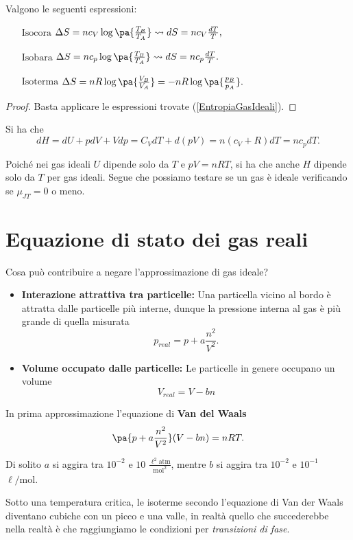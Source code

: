 \begin{proposition}
Valgono le seguenti espressioni:

\begin{itemize}
\item[$\boxed{\text{Isocora}}$] $\Delta S=nc_V\log\pa{\frac{T_B}{T_A}}\leadsto dS=nc_V\frac{dT}T,$
\item[$\boxed{\text{Isobara}}$] $\Delta S=nc_p\log\pa{\frac{T_B}{T_A}}\leadsto dS=nc_p\frac{dT}T.$
\item[$\boxed{\text{Isoterma}}$] $\Delta S=nR\log\pa{\frac{V_B}{V_A}}=-nR\log\pa{\frac{p_B}{p_A}}.$
\end{itemize}
\end{proposition}
\begin{proof}
Basta applicare le espressioni trovate (\ref{EntropiaGasIdeali}).
\end{proof}

\begin{remark}
Si ha che
\[dH=dU+pdV+Vdp=C_VdT+d(pV)=n(c_V+R)dT=nc_pdT.\]
\end{remark}

\begin{remark}
Poich\'e nei gas ideali $U$ dipende solo da $T$ e $pV=nRT$, si ha che anche $H$ dipende solo da $T$ per gas ideali. Segue che possiamo testare se un gas \`e ideale verificando se $\mu_{JT}=0$ o meno.
\end{remark}












\section{Equazione di stato dei gas reali}
Cosa pu\`o contribuire a negare l'approssimazione di gas ideale?
\begin{itemize}
\item \textbf{Interazione attrattiva tra particelle:} Una particella vicino al bordo \`e attratta dalle particelle pi\`u interne, dunque la pressione interna al gas \`e pi\`u grande di quella misurata 
\[p_{real}=p+a\frac {n^2}{V^2}.\]
\item \textbf{Volume occupato dalle particelle:} Le particelle in genere occupano un volume
\[V_{real}=V-bn\]
\end{itemize}
\begin{fact}
In prima approssimazione l'equazione di \textbf{Van del Waals}
\[\pa{p+a \frac{n^2}{V^2}}(V-bn)=nRT.\]
\end{fact}
\begin{remark}
Di solito $a$ si aggira tra $10^{-2}$ e $10$ $\displaystyle\frac{\ell^2\mathrm{atm}}{\mathrm{mol}^2}$, mentre $b$ si aggira tra $10^{-2}$ e $10^{-1}$ $\ell/\mathrm{mol}$.
\end{remark}

\noindent
Sotto una temperatura critica, le isoterme secondo l'equazione di Van der Waals diventano cubiche con un picco e una valle, in realt\`a quello che succederebbe nella realt\`a \`e che raggiungiamo le condizioni per \textit{transizioni di fase}.